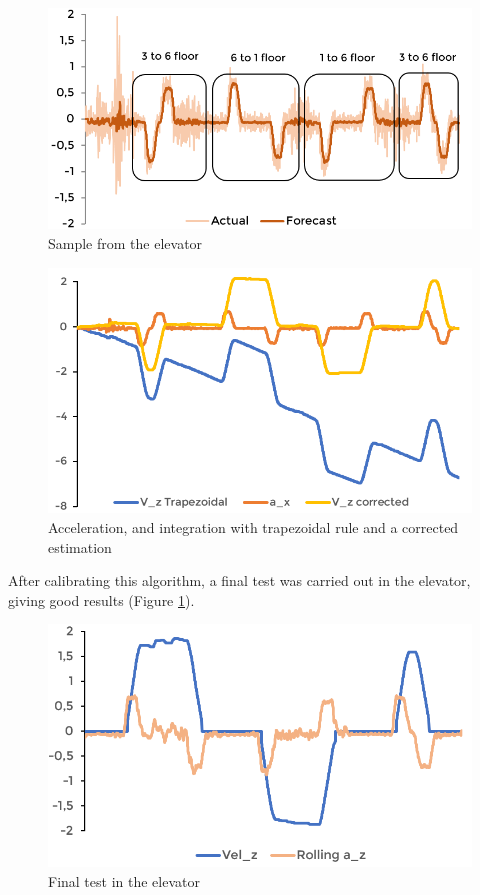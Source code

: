 \begin{figure}[h!]
	\includegraphics[width=1.0\linewidth]{figs/04/acceleration/3}
	\caption{Sample from the elevator}
\end{figure}
\begin{figure}[h!]
	\includegraphics[width=1.0\linewidth]{figs/04/acceleration/4}
	\caption{Acceleration, and integration with trapezoidal rule and a corrected estimation}
\end{figure}

After calibrating this algorithm, a final test was carried out in the elevator, giving good results (Figure \ref{filtered}).

\begin{figure}[h!]
	\includegraphics[width=1.0\linewidth]{figs/04/acceleration/6}
	\caption{Final test in the elevator}
	\label{filtered}
\end{figure}


